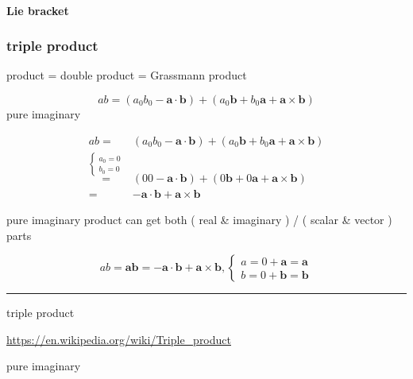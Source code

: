 \documentclass[
]{book}
\theoremstyle{definition}
\theoremstyle{definition}
\theoremstyle{definition}
\theoremstyle{definition}
\theoremstyle{remark}
\begin{document}
\paragraph{Lie bracket}\label{lie-bracket}

\subsubsection{triple product}\label{triple-product}

product = double product = Grassmann product

\[
ab=\left(a_{{\scriptscriptstyle 0}}b_{{\scriptscriptstyle 0}}-\boldsymbol{a}\cdot\boldsymbol{b}\right)+\left(a_{{\scriptscriptstyle 0}}\boldsymbol{b}+b_{{\scriptscriptstyle 0}}\boldsymbol{a}+\boldsymbol{a}\times\boldsymbol{b}\right)
\]
pure imaginary

\[
\begin{aligned}
ab= & \left(a_{{\scriptscriptstyle 0}}b_{{\scriptscriptstyle 0}}-\boldsymbol{a}\cdot\boldsymbol{b}\right)+\left(a_{{\scriptscriptstyle 0}}\boldsymbol{b}+b_{{\scriptscriptstyle 0}}\boldsymbol{a}+\boldsymbol{a}\times\boldsymbol{b}\right)\\
\overset{\begin{cases}
a_{0}=0\\
b_{0}=0
\end{cases}}{=} & \left(00-\boldsymbol{a}\cdot\boldsymbol{b}\right)+\left(0\boldsymbol{b}+0\boldsymbol{a}+\boldsymbol{a}\times\boldsymbol{b}\right)\\
= & -\boldsymbol{a}\cdot\boldsymbol{b}+\boldsymbol{a}\times\boldsymbol{b}
\end{aligned}
\]

pure imaginary product can get both ( real \& imaginary ) / ( scalar \& vector ) parts

\[
ab=\boldsymbol{a}\boldsymbol{b}=-\boldsymbol{a}\cdot\boldsymbol{b}+\boldsymbol{a}\times\boldsymbol{b},\begin{cases}
a=0+\boldsymbol{a}=\boldsymbol{a}\\
b=0+\boldsymbol{b}=\boldsymbol{b}
\end{cases}
\]

\begin{center}\rule{0.5\linewidth}{0.5pt}\end{center}

triple product

\url{https://en.wikipedia.org/wiki/Triple_product}

pure imaginary
\end{document}
